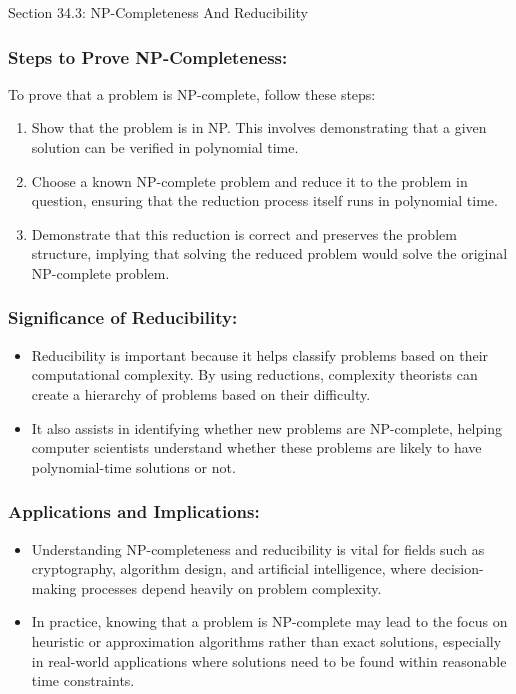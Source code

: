\begin{notes}{Section 34.3: NP-Completeness And Reducibility}
    \subsubsection*{Steps to Prove NP-Completeness:}
    
    To prove that a problem is NP-complete, follow these steps:
    \begin{enumerate}
        \item Show that the problem is in NP. This involves demonstrating that a given solution can be verified in polynomial time.
        \item Choose a known NP-complete problem and reduce it to the problem in question, ensuring that the reduction process itself runs in polynomial time.
        \item Demonstrate that this reduction is correct and preserves the problem structure, implying that solving the reduced problem would solve the original NP-complete problem.
    \end{enumerate}
    
    \subsubsection*{Significance of Reducibility:}
    
    \begin{itemize}
        \item Reducibility is important because it helps classify problems based on their computational complexity. By using reductions, complexity theorists can create a hierarchy of problems based on their difficulty.
        \item It also assists in identifying whether new problems are NP-complete, helping computer scientists understand whether these problems are likely to have polynomial-time solutions or not.
    \end{itemize}
    
    \subsubsection*{Applications and Implications:}
    
    \begin{itemize}
        \item Understanding NP-completeness and reducibility is vital for fields such as cryptography, algorithm design, and artificial intelligence, where decision-making processes depend heavily on problem complexity.
        \item In practice, knowing that a problem is NP-complete may lead to the focus on heuristic or approximation algorithms rather than exact solutions, especially in real-world applications where 
        solutions need to be found within reasonable time constraints.
    \end{itemize}    
\end{notes}